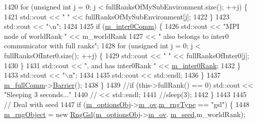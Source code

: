 \begin{DoxyCode}
{1420         \textcolor{keywordflow}{for} (\textcolor{keywordtype}{unsigned} \textcolor{keywordtype}{int} j = 0; j < fullRanksOfMySubEnvironment.size(); ++j) \{
1421           std::cout << \textcolor{stringliteral}{" "} << fullRanksOfMySubEnvironment[j];
1422         \}
1423         std::cout << \textcolor{stringliteral}{"\(\backslash\)n"};
1424 
1425         \textcolor{keywordflow}{if} (\hyperlink{class_q_u_e_s_o_1_1_base_environment_a5107d456b4267a20f3f48222e52f0c7b}{m\_inter0Comm}) \{
1426           std::cout << \textcolor{stringliteral}{"MPI node of worldRank "} << m\_worldRank
1427                     << \textcolor{stringliteral}{" also belongs to inter0 communicator with full ranks"};
1428           \textcolor{keywordflow}{for} (\textcolor{keywordtype}{unsigned} \textcolor{keywordtype}{int} j = 0; j < fullRanksOfInter0.size(); ++j) \{
1429             std::cout << \textcolor{stringliteral}{" "} << fullRanksOfInter0[j];
1430           \}
1431           std::cout << \textcolor{stringliteral}{", and has inter0Rank "} << \hyperlink{class_q_u_e_s_o_1_1_base_environment_a1feb61fba41bc96f4913892df85e6853}{m\_inter0Rank};
1432         \}
1433         std::cout << \textcolor{stringliteral}{"\(\backslash\)n"};
1434 
1435         std::cout << std::endl;
1436       \}
1437       \hyperlink{class_q_u_e_s_o_1_1_base_environment_a8e80c9067b0875c419f1b9ecccbdb46d}{m\_fullComm}->\hyperlink{class_q_u_e_s_o_1_1_mpi_comm_a4059971c30e023b272fccaa6aa00c426}{Barrier}();
1438     \}
1439     \textcolor{comment}{//if (this->fullRank() == 0) std::cout << "Sleeping 3 seconds..."}
1440     \textcolor{comment}{//                                     << std::endl;}
1441     \textcolor{comment}{//sleep(3);}
1442   \}
1443 
1445   \textcolor{comment}{// Deal with seed}
1447 \textcolor{comment}{}  \textcolor{keywordflow}{if} (\hyperlink{class_q_u_e_s_o_1_1_base_environment_aa91c7ac0ab11472bafb0ae4ac36d2194}{m\_optionsObj}->\hyperlink{class_q_u_e_s_o_1_1_environment_options_a97de0e8029b2d567643ab2b1b6ba2b9c}{m\_ov}.\hyperlink{class_q_u_e_s_o_1_1_env_options_values_a01502ec46080bf43c99d55646e6a1b7f}{m\_rngType} == \textcolor{stringliteral}{"gsl"}) \{
1448     \hyperlink{class_q_u_e_s_o_1_1_base_environment_a5e80f48ab043b532ee9d4864cd363574}{m\_rngObject} = \textcolor{keyword}{new} \hyperlink{class_rng_gsl}{RngGsl}(\hyperlink{class_q_u_e_s_o_1_1_base_environment_aa91c7ac0ab11472bafb0ae4ac36d2194}{m\_optionsObj}->\hyperlink{class_q_u_e_s_o_1_1_environment_options_a97de0e8029b2d567643ab2b1b6ba2b9c}{m\_ov}.
      \hyperlink{class_q_u_e_s_o_1_1_env_options_values_adf0629a19e30b4f907b2e5fc90c9830a}{m\_seed},m\_worldRank);
}
\end{DoxyCode}
